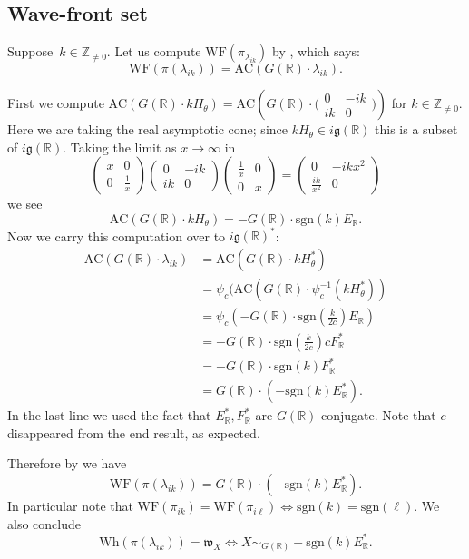 \documentclass[cupthm]{CUP-JNL-JMJ}
\numberwithin{equation}{section}
\theoremstyle{cupplain}
\theoremstyle{cupdefinition}
\theoremstyle{cupremark}
\theoremstyle{cupproof}
\newcommand{\sgn}{\mathrm{sgn}}
\newcommand{\R}{\mathbb R}
\newcommand{\Z}{\mathbb Z}
\newcommand{\g}{\mathfrak g}
\newcommand\inv{^{-1}}
\newcommand{\w}{\mathfrak w}
\newcommand{\Wh}{\mathrm{Wh}}
\newcommand{\WF}{\mathrm{WF}}
\newcommand{\AC}{\mathrm{AC}}
\begin{document}
\subsection{Wave-front set}

Suppose~$k \in \Z_{\neq 0}$. Let us compute $\WF(\pi_{\lambda_{ik}})$ by  \cite{HarrisHeOlafsson}, which says:
$$
\WF(\pi(\lambda_{ik}))=\AC(G(\R)\cdot \lambda_{ik}).
$$

First we compute $\AC(G(\R)\cdot kH_\theta)=\AC\left(G(\R)\cdot\big(\begin{smallmatrix}0&-ik\\ik&0
\end{smallmatrix}\big)\right)$ for $k\in \Z_{\ne 0}$.
Here we are taking the real asymptotic cone; since $kH_\theta\in i\g(\R)$ this is a subset of $i\g(\R)$. 
Taking the limit as $x\rightarrow \infty$ in 
$$
\begin{pmatrix}
x&0\\0&\frac 1x
\end{pmatrix}
\begin{pmatrix}0&-ik\\ik&0
\end{pmatrix}\begin{pmatrix}
\frac 1x&0\\0&x
\end{pmatrix}=
\begin{pmatrix}0&-ikx^2\\\frac{ik}{x^2}&0
\end{pmatrix}
$$
we see
$$
\AC(G(\R)\cdot kH_\theta)=-G(\R)\cdot\sgn(k)E_\R.
$$
Now we carry this computation over to $i\g(\R)^*$:
$$
\begin{aligned}
\AC(G(\R)\cdot\lambda_{ik})&=\AC(G(\R)\cdot kH_\theta^*)\\
&=\psi_c(\AC(G(\R)\cdot \psi_c\inv(kH_\theta^*))\\
&=\psi_c(-G(\R)\cdot\sgn(\frac k{2c})E_\R)\\
&=-G(\R)\cdot\sgn(\frac k{2c})cF_\R^*\\
&=-G(\R)\cdot\sgn(k)F_\R^*\\
&=G(\R)\cdot(-\sgn(k)E_\R^*).
\end{aligned}
$$
In the last line we used the fact that $E_\R^*,F_\R^*$ are $G(\R)$-conjugate.
Note that $c$ disappeared from the end result, as expected.

Therefore by 
\cite{HarrisHeOlafsson} we have
\begin{equation}
\label{e:WF}
\WF(\pi(\lambda_{ik}))=G(\R)\cdot (-\sgn(k)E_\R^*).
\end{equation}
In particular note that $\WF(\pi_{ik})=\WF(\pi_{i\ell})\Leftrightarrow \sgn(k)=\sgn(\ell)$.
We also conclude
$$
\Wh(\pi(\lambda_{ik}))=\w_X\Leftrightarrow X\sim_{G(\R)} -\sgn(k)E_\R^*.
$$
\end{document}
